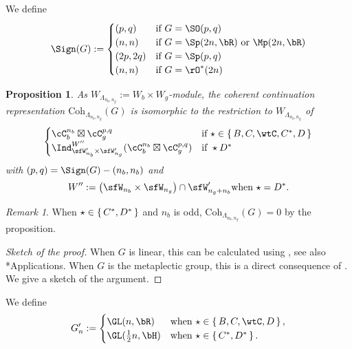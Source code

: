 \documentclass[12pt,a4paper]{amsart}
\numberwithin{equation}{section}
\newtheorem{prop}[thm]{Proposition}
\theoremstyle{remark}
\newtheorem*{remark}{Remark}
\def\half{{\tfrac{1}{2}}}
\def\Coh{\mathrm{Coh}}
\begin{document}
We define
\[
\Sign(G):= \begin{cases}
  (p,q) & \text{if } G = \SO(p,q)\\
  (n,n) & \text{if } G = \Sp(2n,\bR) \text{ or } \Mp(2n,\bR)\\
  (2p,2q) & \text{if } G = \Sp(p,q) \\
  (n,n) & \text{if } G = \rO^{*}(2n) \\
\end{cases}
\]

\begin{prop}
  As $W_{\Lambda_{n_{b},n_{g}}}:= W_{b}\times W_{g}$-module, the coherent
  continuation representation $\Coh_{\Lambda_{n_{b},n_{g}}}(G)$
  is isomorphic to the restriction to $W_{\Lambda_{n_{b},n_{g}}}$
  of
  \[
    \begin{cases}
    \cC_{b}^{n_{b}}\boxtimes\cC_{g}^{p,q} & \text{if } \star \in \set{B,C,\wtC,C^{*},D}\\
    \Ind_{\sfW'_{n_{b}}\times \sfW'_{n_{g}}}^{W''}(\cC_{b}^{n_{b}}\boxtimes\cC_{g}^{p,q}) & \text{if } \star D^{*}\\
  \end{cases}
\]
with $(p,q) = \Sign(G) - (n_{b},n_{b})$ and
\[
  W'' := \left(\sfW_{n_{b}}\times \sfW_{n_{g}}\right)\cap \sfW'_{n_{g}+n_{b}}
  \text{when $\star = D^{*}$.}
\]


\end{prop}
\begin{remark}
  When $\star \in \set{C^{*},D^{*}}$ and $n_{b}$ is odd,
  $\Coh_{\Lambda_{n_{b},n_{g}}}(G)=0$ by the proposition.
\end{remark}
\begin{proof}[Sketch of the proof]
  When $G$ is linear, this can be calculated using \cite{AC}, see also \cite{Mc}*{Applications}.
  When $G$ is the metaplectic group, this is a direct consequence of
  \cite{RT1,RT2}.
  We give a sketch of the argument.
\end{proof}

We define
\[
G'_{n} := \begin{cases}
  \GL(n,\bR) & \text{when } \star \in \set{B,C,\wtC,D}, \\
  \GL(\half n,\bH) & \text{when } \star \in \set{C^{*},D^{*}}. \\
\end{cases}
\]
\end{document}
